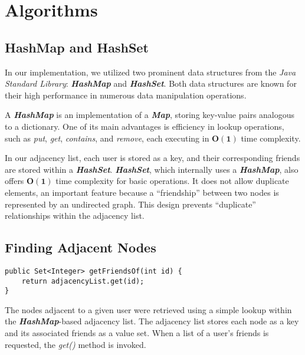 \section*{\textbf{Algorithms}}

\subsection*{\textbf{HashMap and HashSet}}
In our implementation, we utilized two prominent data structures from the \textit{Java Standard Library}: \textit{\textbf{HashMap}} and \textit{\textbf{HashSet}}. Both data structures are known for their high performance in numerous data manipulation operations. 

A \textit{\textbf{HashMap}} is an implementation of a \textit{\textbf{Map}}, storing key-value pairs analogous to a dictionary. One of its main advantages is efficiency in lookup operations, such as \textit{put}, \textit{get}, \textit{contains}, and \textit{remove}, each executing in $\mathbf{O(1)}$ time complexity.

In our adjacency list, each user is stored as a key, and their corresponding friends are stored within a \textit{\textbf{HashSet}}. \textit{\textbf{HashSet}}, which internally uses a \textit{\textbf{HashMap}}, also offers $\mathbf{O(1)}$ time complexity for basic operations. It does not allow duplicate elements, an important feature because a “friendship” between two nodes is represented by an undirected graph. This design prevents “duplicate” relationships within the adjacency list.\cite{bajracharya}

\subsection*{\textbf{Finding Adjacent Nodes}}
\begin{lstlisting}
public Set<Integer> getFriendsOf(int id) {
    return adjacencyList.get(id);
}
\end{lstlisting}
The nodes adjacent to a given user were retrieved using a simple lookup within the \textit{\textbf{HashMap}}-based adjacency list. The adjacency list stores each node as a key and its associated friends as a value set. When a list of a user's friends is requested, the \textit{get()} method is invoked.

